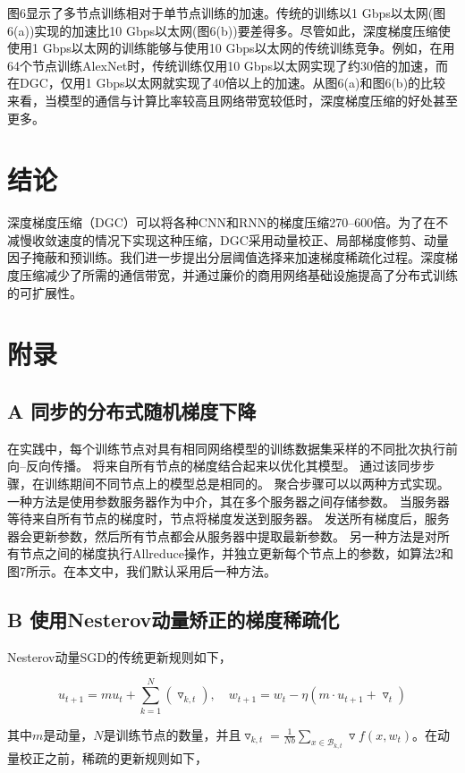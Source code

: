 图6显示了多节点训练相对于单节点训练的加速。传统的训练以1 Gbps以太网(图6(a))实现的加速比10 Gbps以太网(图6(b))要差得多。尽管如此，深度梯度压缩使使用1 Gbps以太网的训练能够与使用10 Gbps以太网的传统训练竞争。例如，在用64个节点训练AlexNet时，传统训练仅用10 Gbps以太网实现了约30倍的加速，而在DGC，仅用1 Gbps以太网就实现了40倍以上的加速。从图6(a)和图6(b)的比较来看，当模型的通信与计算比率较高且网络带宽较低时，深度梯度压缩的好处甚至更多。

\section{结论}
深度梯度压缩（DGC）可以将各种CNN和RNN的梯度压缩270--600倍。为了在不减慢收敛速度的情况下实现这种压缩，DGC采用动量校正、局部梯度修剪、动量因子掩蔽和预训练。我们进一步提出分层阈值选择来加速梯度稀疏化过程。深度梯度压缩减少了所需的通信带宽，并通过廉价的商用网络基础设施提高了分布式训练的可扩展性。

\section{附录}
\subsection{A 同步的分布式随机梯度下降}
在实践中，每个训练节点对具有相同网络模型的训练数据集采样的不同批次执行前向--反向传播。 将来自所有节点的梯度结合起来以优化其模型。 通过该同步步骤，在训练期间不同节点上的模型总是相同的。 聚合步骤可以以两种方式实现。 一种方法是使用参数服务器作为中介，其在多个服务器之间存储参数。 当服务器等待来自所有节点的梯度时，节点将梯度发送到服务器。 发送所有梯度后，服务器会更新参数，然后所有节点都会从服务器中提取最新参数。 另一种方法是对所有节点之间的梯度执行Allreduce操作，并独立更新每个节点上的参数，如算法2和图7所示。在本文中，我们默认采用后一种方法。

\subsection{B 使用Nesterov动量矫正的梯度稀疏化}
Nesterov动量SGD的传统更新规则如下，

\begin{equation}
	\label{eq:nsgd}
	u_{t+1} = mu_{t}+ \sum_{k=1}^{N}\left( \triangledown_{k,t}\right),\quad  w_{t+1} = w_{t} - \eta \left(m\cdot u_{t+1} + \triangledown_{t}\right)
\end{equation}

其中$m$是动量，$N$是训练节点的数量，并且$\triangledown_{k,t} =  \frac{1}{Nb} \sum_{x \in \mathcal{B}_{k, t}} \triangledown f(x, w_{t})$。在动量校正之前，稀疏的更新规则如下，

